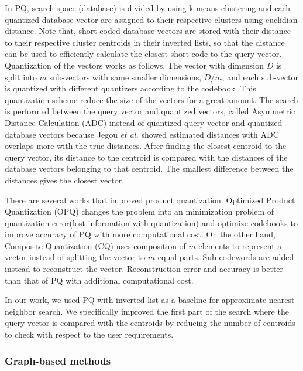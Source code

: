 In PQ, search space (database) is divided by using k-means clustering and each quantized database vector are assigned to their respective clusters using euclidian distance. 
Note that, short-coded database vectors are stored with their distance to their respective cluster centroids in their inverted lists, so that the distance can be used to efficiently calculate the closest short code to the query vector.
Quantization of the vectors works as follows.
The vector with dimension $D$ is split into $m$ sub-vectors with same smaller dimensions, $D/m$, and each sub-vector is quantized with different quantizers according to the codebook. 
This quantization scheme reduce the size of the vectors for a great amount.
The search is performed between the query vector and quantized vectors, called Asymmetric Distance Calculation (ADC) instead of quantized query vector and quantized database vectors because Jegou \emph{et al.} showed estimated distances with ADC overlaps more with the true distances.
After finding the closest centroid to the query vector, its distance to the centroid is compared with the distances of the database vectors belonging to that centroid. 
The smallest difference between the distances gives the closest vector.

There are several works that improved product quantization. Optimized Product Quantization (OPQ)\cite{ge2013optimized} changes the problem into an minimization problem of quantization error(lost information with quantization) and optimize codebooks to improve accuracy of PQ with more computational cost. 
On the other hand, Composite Quantization (CQ)\cite{wang2018composite} uses composition of $m$ elements to represent a vector instead of splitting the vector to $m$ equal parts. 
Sub-codewords are added instead to reconstruct the vector. 
Reconstruction error and accuracy is better than that of PQ with additional computational cost.

In our work, we used PQ with inverted list as a baseline for approximate nearest neighbor search. 
We specifically improved the first part of the search where the query vector is compared with the centroids by reducing the number of centroids to check with respect to the user requirements. 

\subsubsection*{Graph-based methods}

